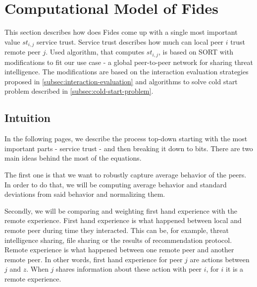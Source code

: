 \section{Computational Model of Fides}
\label{sec:computational-model}
This section describes how does Fides come up with a single most important value $st_{i,j}$ service trust. Service trust describes how much can local peer $i$ trust remote peer $j$.
Used algorithm, that computes $st_{i,j}$, is based on SORT\cite{sort} with modifications to fit our use case - a global peer-to-peer network for sharing threat intelligence. The modifications are based on the interaction evaluation strategies proposed in \ref{subsec:interaction-evaluation} and algorithms to solve cold start problem described in \ref{subsec:cold-start-problem}.

\subsection{Intuition}
In the following pages, we describe the process top-down starting with the most important parts - service trust - and then breaking it down to bits.
There are two main ideas behind the most of the equations. 

The first one is that we want to robustly capture average behavior of the peers. In order to do that, we will be computing average behavior and standard deviations from said behavior and normalizing them.

Secondly, we will be comparing and weighting first hand experience with the remote experience. 
First hand experience is what happened between local and remote peer during time they interacted. This can be, for example, threat intelligence sharing, file sharing or the results of recommendation protocol.
Remote experience is what happened between one remote peer and another remote peer. In other words, first hand experience for peer $j$ are actions between $j$ and $z$. When $j$ shares information about these action with peer $i$, for $i$ it is a remote experience.

